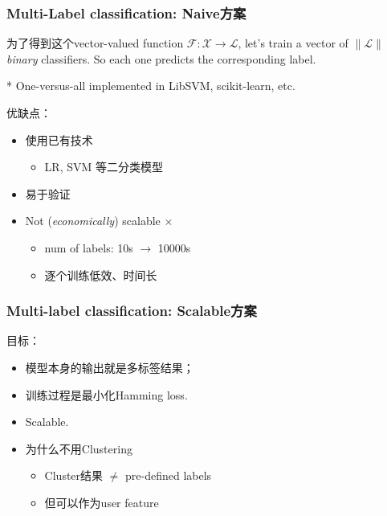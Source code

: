 \documentclass{beamer}
\begin{document}
\begin{frame}
\frametitle{Multi-Label classification: Naive方案}

为了得到这个vector-valued function $\mathcal{F} : \mathcal{X} \rightarrow \mathcal{L}$, let's train a vector of $\|\mathcal{L}\|$ \textit{binary} classifiers. So each one predicts the corresponding label.

* {\small \color{gray} One-versus-all implemented in LibSVM, scikit-learn, etc.}

\pause

优缺点：
\begin{itemize}
\item 使用已有技术 {  \color{green} \checkmark}
  \begin{itemize}
  \item LR, SVM 等二分类模型
  \end{itemize}
\item 易于验证 {  \color{green} \checkmark}
\item Not (\textit{economically}) scalable  {  \color{red} $\times$}
  \begin{itemize}
  \item num of labels: 10s $\rightarrow$ 10000s 
  \item 逐个训练低效、时间长
  \end{itemize}
\end{itemize}
\end{frame}

\begin{frame}
\frametitle{Multi-label classification: Scalable方案}
目标：
  \begin{itemize}
    \item 模型本身的输出就是多标签结果；
    \item 训练过程是最小化Hamming loss.
    \item Scalable.
  \end{itemize}
\pause

\begin{itemize}
\item 为什么不用Clustering
  \begin{itemize}
    \item Cluster结果 $\neq$  pre-defined labels
    \item 但可以作为user feature
  \end{itemize}
\end{itemize}
\end{frame}
\end{document}

